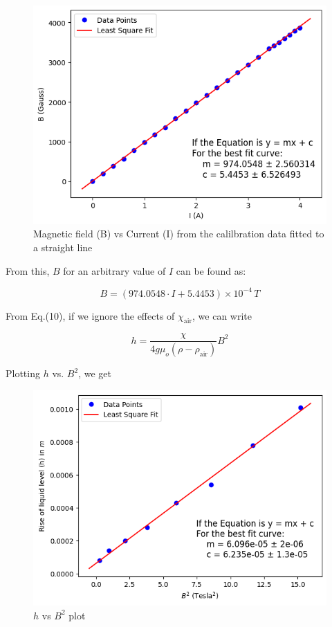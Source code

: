     \begin{figure}[H]
        \centering
        \includegraphics[width=0.8\columnwidth]{images/plot1.png}
        \caption{Magnetic field (B) vs Current (I) from the calilbration data fitted to a straight line}
        \label{plot:1}
    \end{figure}

    From this, $B$ for an arbitrary value of $I$ can be found as:

    \begin{equation}
        B = (974.0548\cdot I + 5.4453)\times10^{-4}\,T
    \end{equation}

    From Eq.(10), if we ignore the effects of $\chi_\text{air}$, we can write

    \begin{equation}
        h = \frac{\chi}{4g\mu_o(\rho - \rho_\text{air})}B^2
    \end{equation}

    Plotting $h$ vs. $B^2$, we get

    \begin{figure}[H]
        \centering
        \includegraphics[width=0.8\columnwidth]{images/plot2.png}
        \caption{$h$ vs $B^2$ plot}
        \label{plot:1}
    \end{figure}

